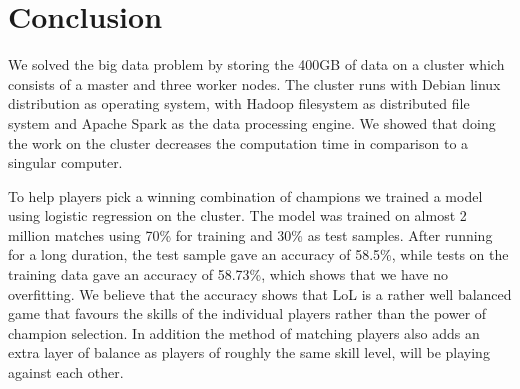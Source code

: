\section{Conclusion}\label{sec:conclusion}
We solved the big data problem by storing the 400GB of data on a cluster which consists of a master and three worker nodes. The cluster runs with Debian linux distribution as operating system, with Hadoop filesystem as distributed file system and Apache Spark as the data processing engine. We showed that doing the work on the cluster decreases the computation time in comparison to a singular computer.

To help players pick a winning combination of champions we trained a model using logistic regression on the cluster. The model was trained on almost 2 million matches using 70\% for training and 30\% as test samples. After running for a long duration, the test sample gave an accuracy of 58.5\%, while tests on the training data gave an accuracy of 58.73\%, which shows that we have no overfitting. We believe that the accuracy shows that LoL is a rather well balanced game that favours the skills of the individual players rather than the power of champion selection. In addition the method of matching players also adds an extra layer of balance as players of roughly the same skill level, will be playing against each other.




